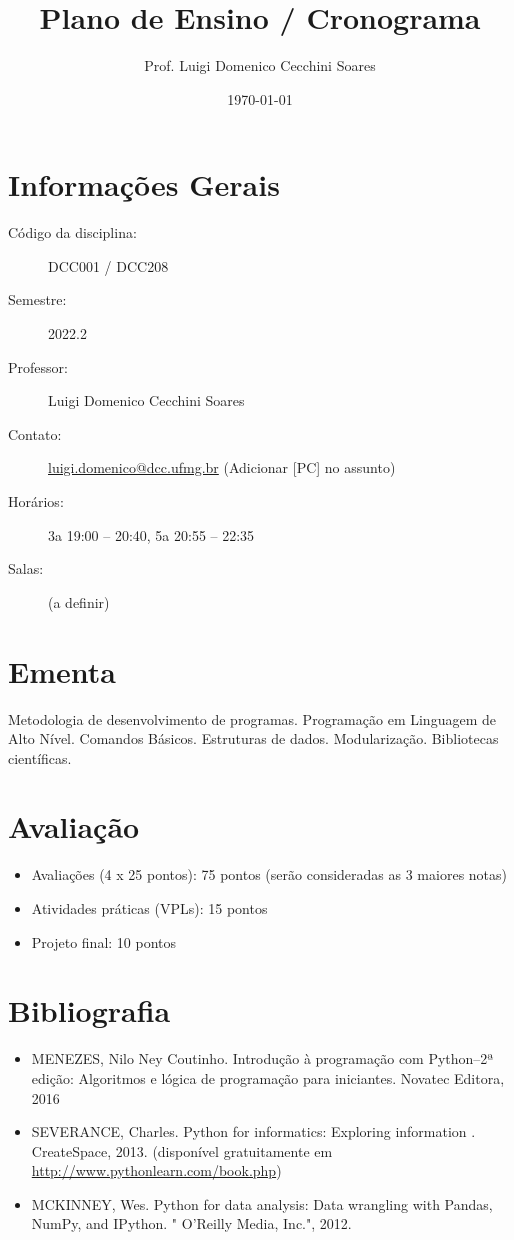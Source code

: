 \documentclass[a4paper, 11pt]{article}
\title{Plano de Ensino / Cronograma}
\author{Prof. Luigi Domenico Cecchini Soares}
\date{\today}
\title{}
\makeatletter
\let\thetitle\@title{}
\makeatother
\begin{document}
\begin{center}
\Large\bfseries\thetitle
\end{center}

\section{Informações Gerais}
\label{sec:orgc2a6a45}

\begin{description}
\item[{Código da disciplina:}] DCC001 / DCC208
\item[{Semestre:}] 2022.2
\item[{Professor:}] Luigi Domenico Cecchini Soares
\item[{Contato:}] \href{mailto:luigi.domenico@dcc.ufmg.br}{luigi.domenico@dcc.ufmg.br} (Adicionar [PC] no assunto)
\item[{Horários:}] 3a 19:00 -- 20:40, 5a 20:55 -- 22:35
\item[{Salas:}] (a definir)
\end{description}

\section{Ementa}
\label{sec:orgffb470a}
Metodologia de desenvolvimento de programas. Programação em Linguagem de
Alto Nível. Comandos Básicos. Estruturas de dados. Modularização. Bibliotecas
científicas.

\section{Avaliação}
\label{sec:org3e387bc}

\begin{itemize}
\item Avaliações (4 x 25 pontos): 75 pontos (serão consideradas as 3 maiores notas)
\item Atividades práticas (VPLs): 15 pontos
\item Projeto final: 10 pontos
\end{itemize}

\section{Bibliografia}
\label{sec:orgfac2ac2}

\begin{itemize}
\item MENEZES, Nilo Ney Coutinho. Introdução à programação com Python–2ª edição:
Algoritmos e lógica de programação para iniciantes. Novatec Editora, 2016
\item SEVERANCE, Charles. Python for informatics: Exploring information .
CreateSpace, 2013. (disponível gratuitamente em \url{http://www.pythonlearn.com/book.php})
\item MCKINNEY, Wes. Python for data analysis: Data wrangling with Pandas, NumPy,
and IPython. " O'Reilly Media, Inc.", 2012.
\end{itemize}
\end{document}
